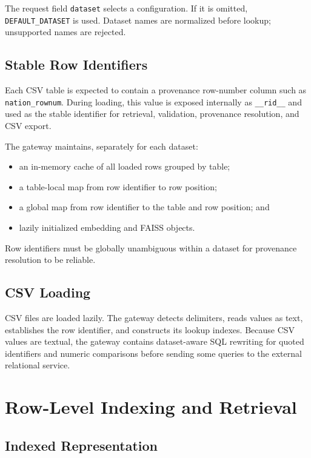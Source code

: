 \documentclass[11pt,a4paper]{article}
\newcommand{\code}[1]{\texttt{#1}}
\begin{document}
The request field \code{dataset} selects a configuration. If it is omitted,
\code{DEFAULT\_DATASET} is used. Dataset names are normalized before lookup;
unsupported names are rejected.

\subsection{Stable Row Identifiers}

Each CSV table is expected to contain a provenance row-number column such as
\code{nation\_rownum}. During loading, this value is exposed internally as
\code{\_\_rid\_\_} and used as the stable identifier for retrieval, validation,
provenance resolution, and CSV export.

The gateway maintains, separately for each dataset:

\begin{itemize}
  \item an in-memory cache of all loaded rows grouped by table;
  \item a table-local map from row identifier to row position;
  \item a global map from row identifier to the table and row position; and
  \item lazily initialized embedding and FAISS objects.
\end{itemize}

Row identifiers must be globally unambiguous within a dataset for provenance
resolution to be reliable.

\subsection{CSV Loading}

CSV files are loaded lazily. The gateway detects delimiters, reads values as text,
establishes the row identifier, and constructs its lookup indexes. Because CSV
values are textual, the gateway contains dataset-aware SQL rewriting for quoted
identifiers and numeric comparisons before sending some queries to the external
relational service.

\section{Row-Level Indexing and Retrieval}
\label{sec:row-retrieval}

\subsection{Indexed Representation}
\end{document}
